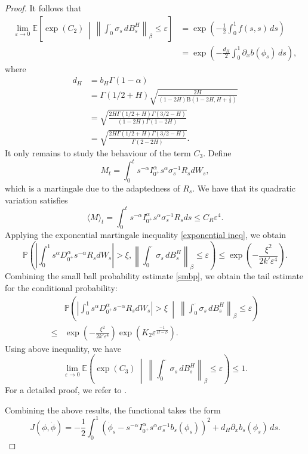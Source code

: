 \documentclass[preprint,12pt]{elsarticle}
\theoremstyle{definition}  %
\theoremstyle{plain}  %
\begin{document}
\begin{proof}
It follows that  
\begin{align*}
\lim_{\varepsilon \to 0} \mathbb{E} \left[ \exp(C_2) \,\middle|\, \left\| \int_0^\cdot \sigma_s\, dB^H_s \right\|_\beta \leq \varepsilon \right] 
&= \exp\left( -\frac{1}{2} \int_0^1 f(s,s)\,ds \right) \\
&= \exp\left( -\frac{d_H}{2} \int_0^1 \partial_x b(\phi_s)\,ds \right),
\end{align*}
where
\begin{align*}
    d_H&= b_H\Gamma(1-\alpha) \\
       &= \Gamma(1/2+H)  \sqrt{\frac{2H}{(1-2H)\mathrm{B}(1-2H,H+\tfrac{1}{2})}} \\
       &=  \sqrt{\frac{2H \Gamma(1/2+H)\Gamma(3/2-H) }{(1-2H)\Gamma(1-2H)}}\\
       &=  \sqrt{\frac{2H \Gamma(1/2+H)\Gamma(3/2-H) }{\Gamma(2-2H)}}.
\end{align*}
It only remains to study the behaviour of the term \(C_3\). 
 Define 
\[
M_t=\int_0^t s^{-\alpha}I_{0^+}^\alpha s^{\alpha}  \sigma_s^{-1} R_sdW_s,
\]
which is a martingale due to the adaptedness of $R_s$. We have that
its quadratic variation satisfies
\begin{equation}
    \langle M \rangle_t=\int_0^t  s^{-\alpha}I_{0^+}^\alpha s^{\alpha}  \sigma_s^{-1} R_s ds \leq C_R\varepsilon^4.
\end{equation}
Applying the exponential martingale inequality \eqref{exponential ineq}, we obtain
\begin{equation*}
 			\mathbb{P}\left(\left|\int_0^1 s^{\alpha}D_{0^+}^\alpha s^{-\alpha} R_sdW_s\right|> \xi,  \left\| \int_0^\cdot \sigma_s\, dB^H_s \right\|_\beta \leq \varepsilon\right)
 	\leq \exp\left(-\frac{\xi^2}{2k'\varepsilon^4}\right).
	\end{equation*}
    Combining the small ball probability estimate \eqref{smbp}, we obtain the tail estimate for the conditional probability:
    \begin{align*}
        &\mathbb{P}\left(\left|\int_0^1 s^{\alpha}D_{0^+}^\alpha s^{-\alpha}R_sdW_s\right|>\xi\ \middle| \ \left\| \int_0^\cdot \sigma_s\, dB^H_s \right\|_\beta \leq \varepsilon\right)\\
 	\leq & \exp\left(-\frac{\xi^2}{2k'\varepsilon^4}\right)\exp(K_2\varepsilon^\frac{-1} {H-\beta}) .
    \end{align*}
Using above inequality, we have
\begin{equation*}
		\lim_{\varepsilon\to 0} \mathbb{E}\left(\exp(C_3)\ \middle| \ \left\| \int_0^\cdot \sigma_s\, dB^H_s \right\|_\beta \leq \varepsilon\right)\leq 1.
	\end{equation*}
For a detailed proof, we refer to \cite{Nualart,zhu2025onsagermachlupfunctionaldistributiondependent}.



Combining the above results, the functional takes the form  
\[
J(\phi,\dot{\phi}) = -\frac{1}{2} \int_0^1 \left(\dot{\phi}_s- s^{-\alpha} I_{0^+}^\alpha s^{\alpha} \sigma_s^{-1}   b_s(\phi_s)  \right)^2+d_H\partial_x b_s(\phi_s) \, ds 
.
\]





\end{proof}
\end{document}
